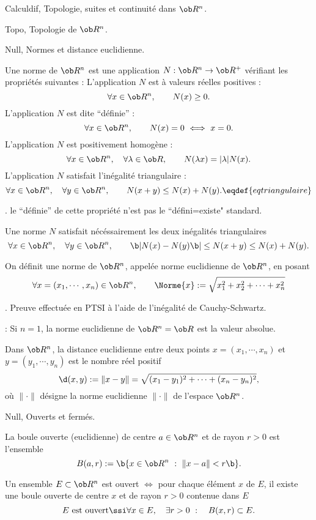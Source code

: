 \Chapter Calculdif, Topologie, suites et continuité dans $\ob R^n$.

\Section Topo, Topologie de $\ob R^n$. 

\Subsection Null, Normes et distance euclidienne. 

\Definition [$n\ge1$]
Une norme de $\ob R^n$ est une application $N:\ob R^n\to\ob R^+$ vérifiant les propriétés suivantes : 
\Bullet L'application $N$ est à valeurs réelles positives :
$$
\forall x\in\ob R^n, \qquad N(x)\ge0.
$$
\Bullet L'application $N$ est dite ``définie'' :
$$
\forall x\in\ob R^n, \qquad N(x)=0\ \Longleftrightarrow\ x=0.
$$
\Bullet L'application $N$ est positivement homogène :
$$
\forall x\in\ob R^n, \quad \forall \lambda\in\ob R,\qquad N(\lambda x)=|\lambda|N(x).
$$
\Bullet L'application $N$ satisfait l'inégalité triangulaire :
$$
\forall x\in\ob R^n, \quad\forall y\in\ob R^n, \qquad N(x+y)\le N(x)+N(y).\eqdef{eqtriangulaire}
$$

. le ``définie'' de cette propriété n'est pas le ``défini=existe" standard. 
\medskip 

\noindent
{} Une norme $N$ satisfait nécéssairement les deux inégalités triangulaires 
$$
\forall x\in\ob R^n, \quad \forall y\in\ob R^n, \qquad\b|N(x)-N(y)\b|\le N(x+y)\le N(x)+N(y).
$$

\Propriete [$n\ge1$] On définit une norme de $\ob R^n$, appelée norme euclidienne de $\ob R^n$, en posant 
$$
\forall x=(x_1,\cdots, x_n)\in\ob R^n, \qquad \Norme{x}:=\sqrt{x_1^2+x_2^2+\cdots+x_n^2}
$$

\Demonstration. Preuve effectuée en PTSI à l'aide de l'inégalité de Cauchy-Schwartz.\CQFD

\Remarque : Si $n=1$, la norme euclidienne de $\ob R^n=\ob R$ est la valeur absolue. 
\bigskip


\Definition [$n\ge1$]
Dans $\ob R^n$, la distance euclidienne entre deux points $x=(x_1,\cdots,x_n)$ et $y=(y_1,\cdots,y_n)$ 
est le nombre réel positif 
$$
\d(x,y):=\|x-y\|=\sqrt{(x_1-y_1)^2+\cdots+(x_n-y_n)^2}, 
$$
où $\|\cdot\|$ désigne la norme euclidienne $\|\cdot\|$ de l'espace $\ob R^n$. 


\Subsection Null, Ouverts et fermés. 

La boule ouverte (euclidienne) de centre $a\in\ob R^n$ et de rayon $r>0$ est l'ensemble 
$$
\sc B(a,r):=\b\{x\in\ob R^n\ :\ \|x-a\|<r\b\}.
$$


\Definition [$n\ge1$] 
Un ensemble $E\subset\ob R^n$ est ouvert $\Longleftrightarrow$ pour chaque élément $x$ de $E$, il existe une boule ouverte de centre $x$ et de rayon $r>0$ contenue dans $E$
$$
E\mbox{ est ouvert}\ssi\forall x\in E, \quad \exists r>0\ :\quad \sc B(x,r)\subset E.
$$


